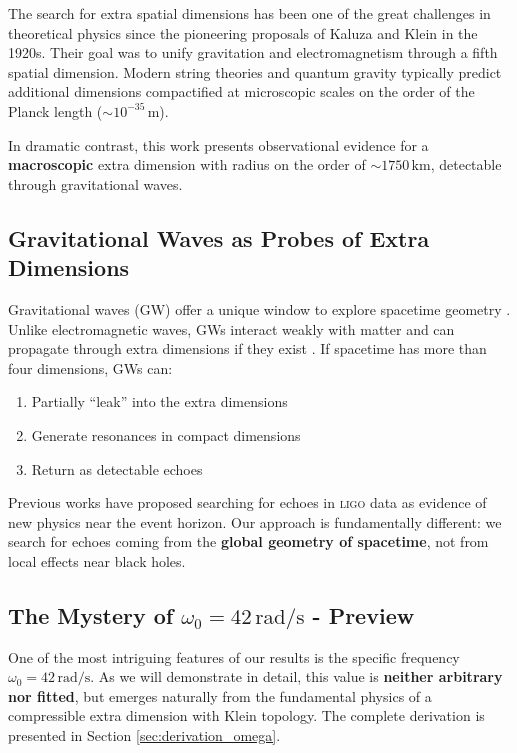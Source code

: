 \documentclass[12pt,a4paper]{article}
\newcommand{\ligo}{\textsc{ligo}}
\begin{document}
The search for extra spatial dimensions has been one of the great challenges in theoretical physics since the pioneering proposals of Kaluza \cite{kaluza1921} and Klein \cite{klein1926} in the 1920s. Their goal was to unify gravitation and electromagnetism through a fifth spatial dimension. Modern string theories \cite{polchinski1998} and quantum gravity \cite{rovelli2004} typically predict additional dimensions compactified at microscopic scales on the order of the Planck length ($\sim 10^{-35}\,\mathrm{m}$).

In dramatic contrast, this work presents observational evidence for a \textbf{macroscopic} extra dimension with radius on the order of $\sim 1750\,\mathrm{km}$, detectable through gravitational waves.

\subsection{Gravitational Waves as Probes of Extra Dimensions}

Gravitational waves (GW) offer a unique window to explore spacetime geometry \cite{thorne1987}. Unlike electromagnetic waves, GWs interact weakly with matter and can propagate through extra dimensions if they exist \cite{cardoso2015}. If spacetime has more than four dimensions, GWs can:

\begin{enumerate}
    \item Partially ``leak'' into the extra dimensions
    \item Generate resonances in compact dimensions
    \item Return as detectable echoes
\end{enumerate}

Previous works \cite{cardoso2016,abedi2017} have proposed searching for echoes in \ligo{} data as evidence of new physics near the event horizon. Our approach is fundamentally different: we search for echoes coming from the \textbf{global geometry of spacetime}, not from local effects near black holes.

\subsection{The Mystery of $\omega_0 = 42\,\mathrm{rad/s}$ - Preview}

One of the most intriguing features of our results is the specific frequency $\omega_0 = 42\,\mathrm{rad/s}$. As we will demonstrate in detail, this value is \textbf{neither arbitrary nor fitted}, but emerges naturally from the fundamental physics of a compressible extra dimension with Klein topology. The complete derivation is presented in Section \ref{sec:derivation_omega}.
\end{document}

